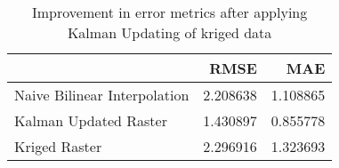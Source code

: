 \begin{table}
\caption{Improvement in error metrics after applying Kalman Updating of kriged data}
\label{tab:florida_keys_gebco_raster_error}
\begin{tabular}{lrr}
\toprule
 & RMSE & MAE \\
\midrule
Naive Bilinear Interpolation & 2.208638 & 1.108865 \\
Kalman Updated Raster & 1.430897 & 0.855778 \\
Kriged Raster & 2.296916 & 1.323693 \\
\bottomrule
\end{tabular}
\end{table}
